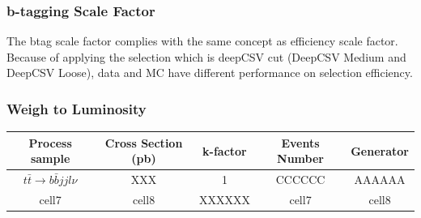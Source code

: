 		\subsubsection{b-tagging Scale Factor}
		\label{sssec:DataAndMC_btagSF}

		The btag scale factor complies with the same concept as efficiency scale factor. Because of applying the selection which is deepCSV cut (DeepCSV Medium and DeepCSV Loose), data and MC have different performance on selection efficiency. 



		\subsubsection{Weigh to Luminosity}
		\label{sssec:DataAndMC_lumi}





\begin{center}
\begin{tabular}{ c c c c c }
\hline
Process sample & Cross Section (pb) & k-factor & Events Number & Generator \\ 
\hline
$t$$\bar{t}\rightarrow b \bar{b}jjl\nu$ & XXX & 1 & CCCCCC & AAAAAA \\
\hline
cell7 & cell8 & XXXXXX & cell7 & cell8 \\
\hline  
\end{tabular}
\end{center}


\FloatBarrier
